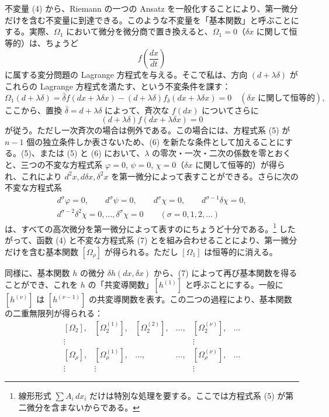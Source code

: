 \documentclass[11pt]{article}
\newcommand{\bdelta}{\bar{\delta}}
\begin{document}
不変量 (4) から、Riemann の一つの Ansatz を一般化することにより、第一微分だけを含む不変量に到達できる。このような不変量を「基本関数」と呼ぶことにする。実際、\(\Omega_1\) において微分を微分商で置き換えると、\(\Omega_1=0\)（\(\delta x\) に関して恒等的）は、ちょうど
\[
f\!\left(\frac{dx}{dt}\right)
\]
に属する変分問題の Lagrange 方程式を与える。そこで私は、方向 \((d+\lambda\delta)\) がこれらの Lagrange 方程式を満たす、という不変条件を課す：
\begin{equation}
\Omega_1(d+\lambda\delta)=
\bdelta f(dx+\lambda\delta x)
-(d+\lambda\delta)f_{\bdelta}(dx+\lambda\delta x)=0
\quad(\text{\(\delta x\) に関して恒等的}),
\tag{5}
\end{equation}
ここから、置換 \(\bdelta=d+\lambda\delta\) によって、斉次な \(f(dx)\) についてさらに
\begin{equation}
(d+\lambda\delta)f(dx+\lambda\delta x)=0
\tag{6}
\end{equation}
が従う。ただし一次斉次の場合は例外である。この場合には、方程式系 (5) が \(n-1\) 個の独立条件しか表さないため、(6) を新たな条件として加えることにする。(5)、または (5) と (6) において、\(\lambda\) の零次・一次・二次の係数を零とおくと、三つの不変な方程式系
\(\varphi=0\), \(\psi=0\), \(\chi=0\)（\(\delta x\) に関して恒等的）が得られ、これにより \(d^2x,d\delta x,\delta^2x\) を第一微分によって表すことができる。さらに次の不変な方程式系
\begin{equation}
\begin{gathered}
d^\sigma\varphi=0,\qquad d^\sigma\psi=0,\qquad
d^\sigma\chi=0,\qquad d^{\sigma-1}\delta\chi=0,\\
d^{\sigma-2}\delta^2\chi=0,\ldots,\delta^\sigma\chi=0
\qquad(\sigma=0,1,2,\ldots)
\end{gathered}
\tag{7}
\end{equation}
は、すべての高次微分を第一微分によって表すのにちょうど十分である。\footnote{線形形式 \(\sum A_i\,dx_i\) だけは特別な処理を要する。ここでは方程式系 (5) が第二微分を含まないからである。} したがって、函数 (4) と不変な方程式系 (7) とを組み合わせることにより、第一微分だけを含む基本関数 \([\Omega_\rho]\) が得られる。ただし \([\Omega_1]\) は恒等的に消える。

同様に、基本関数 \(h\) の微分 \(\delta h(dx,\delta x)\) から、(7) によって再び基本関数を得ることができ、これを \(h\) の「共変導関数」\([h^{(1)}]\) と呼ぶことにする。一般に \([h^{(\nu)}]\) は \([h^{(\nu-1)}]\) の共変導関数を表す。この二つの過程により、基本関数の二重無限列が得られる：
\begin{equation}
\begin{array}{cccccc}
[\Omega_2], & [\Omega_2^{(1)}], & [\Omega_2^{(2)}], & \ldots,
& [\Omega_2^{(\nu)}], & \ldots\\
\vdots &&&& \vdots&\\
{}[\Omega_\rho], & [\Omega_\rho^{(1)}], & \ldots, & \ldots,
& [\Omega_\rho^{(\nu)}], & \ldots\\
\vdots & \vdots &&& \vdots&
\end{array}
\tag{8}
\end{equation}
\end{document}
